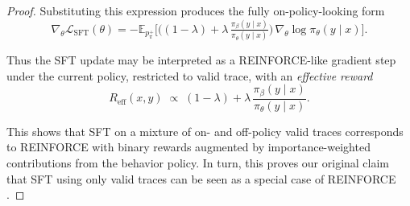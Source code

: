 \begin{proof}
Substituting this expression produces the fully on-policy-looking form
\[
\nabla_\theta \mathcal{L}_{\mathrm{SFT}}(\theta)
=
-\mathbb{E}_{p_\pi^+}
\Big[
\big((1-\lambda)
+
\lambda\,\tfrac{\pi_\beta(y\mid x)}{\pi_\theta(y\mid x)}\big)
\,\nabla_\theta \log \pi_\theta(y\mid x)
\Big].
\]

Thus the SFT update may be interpreted as a REINFORCE-like gradient step under
the current policy, restricted to valid trace, with an \emph{effective
reward}
\[
R_{\mathrm{eff}}(x,y)
\;\propto\;
(1-\lambda)
+
\lambda\,\frac{\pi_\beta(y\mid x)}{\pi_\theta(y\mid x)}.
\]

This shows that SFT on a mixture of on- and off-policy valid traces corresponds
to REINFORCE with binary rewards augmented by importance-weighted contributions
from the behavior policy. In turn, this proves our original claim that SFT
using only valid traces can be seen as a special case of REINFORCE
\cite{williams-jml1992}.
\end{proof}

